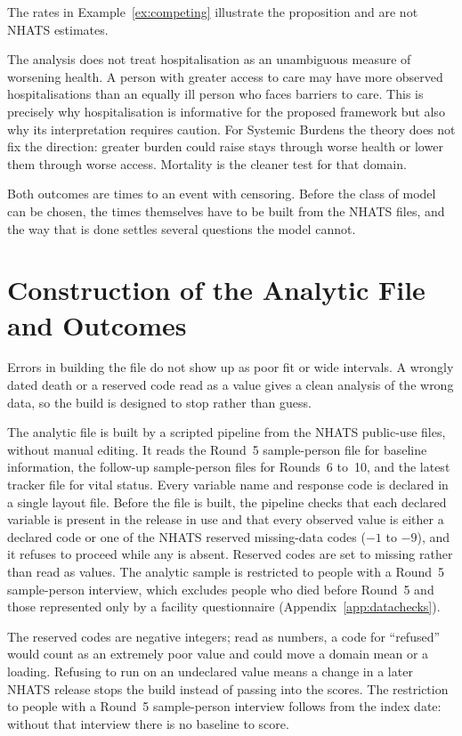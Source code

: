 The rates in Example~\ref{ex:competing} illustrate the proposition and are not NHATS estimates.

The analysis does not treat hospitalisation as an unambiguous measure of worsening health. A person with greater access to care may have more observed hospitalisations than an equally ill person who faces barriers to care. This is precisely why hospitalisation is informative for the proposed framework but also why its interpretation requires caution. For Systemic Burdens the theory does not fix the direction: greater burden could raise stays through worse health or lower them through worse access. Mortality is the cleaner test for that domain.

Both outcomes are times to an event with censoring. Before the class of model can be chosen, the times themselves have to be built from the NHATS files, and the way that is done settles several questions the model cannot.

\section{Construction of the Analytic File and Outcomes}
\label{sec:construction}

Errors in building the file do not show up as poor fit or wide intervals. A wrongly dated death or a reserved code read as a value gives a clean analysis of the wrong data, so the build is designed to stop rather than guess.

The analytic file is built by a scripted pipeline from the NHATS public-use files, without manual editing. It reads the Round~5 sample-person file for baseline information, the follow-up sample-person files for Rounds~6 to~10, and the latest tracker file for vital status. Every variable name and response code is declared in a single layout file. Before the file is built, the pipeline checks that each declared variable is present in the release in use and that every observed value is either a declared code or one of the NHATS reserved missing-data codes ($-1$ to $-9$), and it refuses to proceed while any is absent. Reserved codes are set to missing rather than read as values. The analytic sample is restricted to people with a Round~5 sample-person interview, which excludes people who died before Round~5 and those represented only by a facility questionnaire (Appendix~\ref{app:datachecks}).

The reserved codes are negative integers; read as numbers, a code for ``refused'' would count as an extremely poor value and could move a domain mean or a loading. Refusing to run on an undeclared value means a change in a later NHATS release stops the build instead of passing into the scores. The restriction to people with a Round~5 sample-person interview follows from the index date: without that interview there is no baseline to score.

